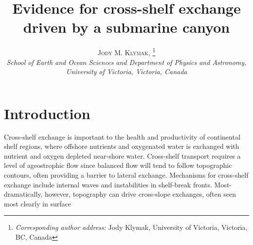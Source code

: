 \documentclass[11pt]{article}
\newcommand{\myabstract}{}
\begin{document}
%
%
\title{\textbf{\large{Evidence for cross-shelf exchange driven by a submarine canyon}}}
%
%
\author{\textsc{Jody M. Klymak,}
				\thanks{\textit{Corresponding author address:}
				Jody Klymak, University of Victoria, Victoria, BC, Canada
				}\quad
				\\
\textit{\footnotesize{School of Earth and Ocean Sciences and Department of Physics and Astronomy, University of Victoria, Victoria, Canada}}
}
%
{
\twocolumn[
\begin{@twocolumnfalse}
\amstitle

\begin{center}
\begin{minipage}{13.0cm}
\begin{abstract}
	\myabstract
	\newline
	\begin{center}
		\rule{38mm}{0.2mm}
	\end{center}
\end{abstract}
\end{minipage}
\end{center}
\end{@twocolumnfalse}
]
}
{
\amstitle
\begin{abstract}
\myabstract
\end{abstract}
\newpage
}
\section{Introduction}

Cross-shelf exchange is important to the health and productivity of continental shelf regions, where offshore nutrients and oxygenated water is exchanged with nutrient and oxygen depleted near-shore water.  Cross-shelf transport requires a level of ageostrophic flow since balanced flow will tend to follow topographic contours, often providing a barrier to lateral exchange.  Mechanisms for cross-shelf exchange include internal waves and instabilities in shelf-break fronts.  Most-dramatically, however, topography can drive cross-slope exchanges, often seen most clearly in surface
\end{document}

